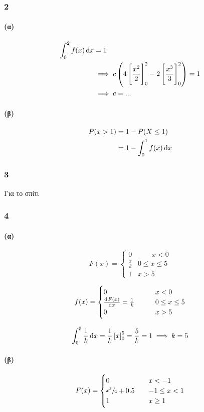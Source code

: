 \documentclass[11pt,a4paper,titlepage,draft]{article}
\begin{document}
\subsubsection*{2}
\paragraph{(α)}
\begin{align*}
\int_0^2 f(x)\dif x &= 1 \\
&\implies c\left(4 \left[\frac{x^2}{2}\right]_0^2 - 2 \left[\frac{x^3}{3}\right]_0^2\right)=1\\
&\implies c=...
\end{align*}

\paragraph{(β)}
\begin{align*}
P(x>1) &= 1-P(X\leq1) \\
&=1-\int_0^1f(x)\dif x
\end{align*}

\subsubsection*{3}
Για το σπίτι

\subsubsection*{4}
\paragraph{(α)}

\[
F(x) = \begin{cases}
0&\qquad x<0\\
\frac{x}{k}&0\leq x\leq 5\\
1&x>5
\end{cases}
\]


\[
f(x) = \begin{cases}
0&\qquad x<0\\
\od{F(x)}{x}=\frac{1}{k}&\qquad 0\leq x\leq 5\\
0&\qquad x>5
\end{cases}
\]

\[
\int_0^5 \frac{1}{k}\dif x=\frac{1}{k}\left[ x\right]_0^5=\frac{5}{k}=1
\implies k=5
\]

\paragraph{(β)}
\[
F(x)=\begin{cases}
0\qquad& x<-1\\
\sfrac{x^3}{4}+0.5\quad&-1\leq x < 1\\
1& x\geq 1
\end{cases}
\]
\end{document}
